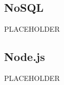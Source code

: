 \documentclass[../glossario.tex]{subfiles}
\begin{document}
\subsection*{NoSQL}
PLACEHOLDER

\subsection*{Node.js}
PLACEHOLDER


    
\end{document}
